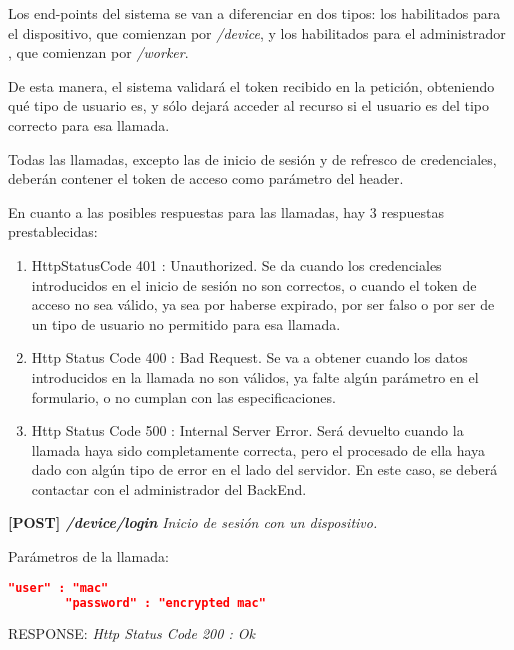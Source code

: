 Los end-points del sistema se van a diferenciar en dos tipos: los habilitados para el dispositivo, que comienzan por \textit{/device}, y los habilitados para el administrador , que comienzan por \textit{/worker}.

De esta manera, el sistema validará el token recibido en la petición, obteniendo qué tipo de usuario es, y sólo dejará acceder al recurso si el usuario es del tipo correcto para esa llamada.

Todas las llamadas, excepto las de inicio de sesión y de refresco de credenciales, deberán contener el token de acceso como parámetro del header.

En cuanto a las posibles respuestas para las llamadas, hay 3 respuestas prestablecidas:
\begin{enumerate}
    \item HttpStatusCode 401 : Unauthorized.\newline
    Se da cuando los credenciales introducidos en el inicio de sesión no son correctos, o cuando el token de acceso no sea válido, ya sea por haberse expirado, por ser falso o por ser de un tipo de usuario no permitido para esa llamada.
    
    \item Http Status Code 400 : Bad Request.\newline
    Se va a obtener cuando los datos introducidos en la llamada no son válidos, ya falte algún parámetro en el formulario, o no cumplan con las especificaciones.
    
    \item Http Status Code 500 : Internal Server Error.\newline
    Será devuelto cuando la llamada haya sido completamente correcta, pero el procesado de ella haya dado con algún tipo de error en el lado del servidor. En este caso, se deberá contactar con el administrador del BackEnd.
    
\end{enumerate}

\textbf{[POST] \textit{/device/login }}
\textit{Inicio de sesión con un dispositivo.}

    Parámetros de la llamada:
    \begin{lstlisting}[language=json,firstnumber=1]
        "user" : "mac"
        "password" : "encrypted mac"
    \end{lstlisting}
    
    RESPONSE:\newline
        \textit{Http Status Code 200 : Ok}
        
